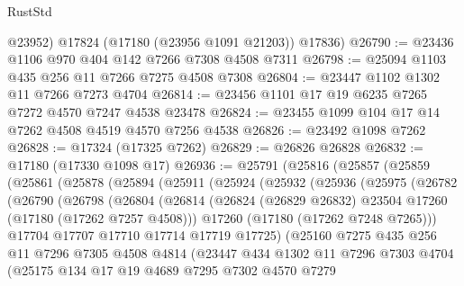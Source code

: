 \begin{lexlean}{RustStd}
\begin{coremodule}
        @23952)
      @17824
      (@17180 (@23956 @1091 @21203))
      @17836)
@26790 := @23436 @1106 @970 @404 @142 @7266 @7308 @4508 @7311
@26798 := @25094 @1103 @435 @256 @11 @7266 @7275 @4508 @7308
@26804 := @23447 @1102 @1302 @11 @7266 @7273 @4704
@26814 := @23456 @1101 @17 @19 @6235 @7265 @7272 @4570 @7247 @4538 @23478
@26824 := @23455 @1099 @104 @17 @14 @7262 @4508 @4519 @4570 @7256 @4538
@26826 := @23492 @1098 @7262
@26828 := @17324 (@17325 @7262)
@26829 := @26826 @26828
@26832 := @17180 (@17330 @1098 @17)
@26936 := @25791
    (@25816
      (@25857
        (@25859
          (@25861
            (@25878
              (@25894
                (@25911
                  (@25924
                    (@25932
                      (@25936
                        (@25975
                          (@26782
                            (@26790
                              (@26798
                                (@26804
                                  (@26814
                                    (@26824
                                      (@26829 @26832)
                                      @23504
                                      @17260
                                      (@17180 (@17262 @7257 @4508)))
                                    @17260
                                    (@17180 (@17262 @7248 @7265)))
                                  @17704
                                  @17707
                                  @17710
                                  @17714
                                  @17719
                                  @17725)
                                (@25160
                                  @7275
                                  @435
                                  @256
                                  @11
                                  @7296
                                  @7305
                                  @4508
                                  @4814
                                  (@23447
                                    @434
                                    @1302
                                    @11
                                    @7296
                                    @7303
                                    @4704
                                    (@25175
                                      @134
                                      @17
                                      @19
                                      @4689
                                      @7295
                                      @7302
                                      @4570
                                      @7279

\end{coremodule}
\end{lexlean}
